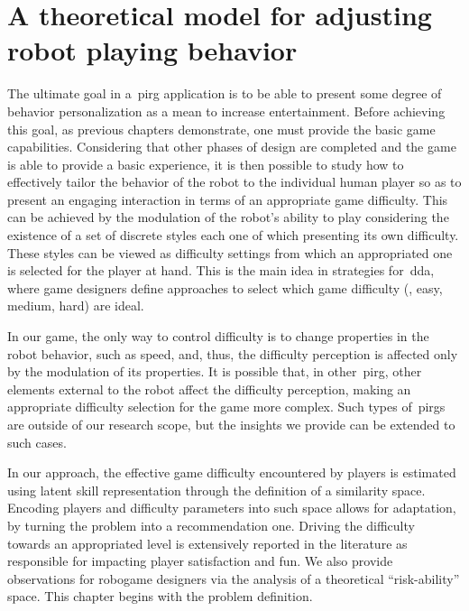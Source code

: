 \chapter{A theoretical model for adjusting robot playing behavior}\label{ch:adaptation}

The ultimate goal in a~\gls{pirg} application is to be able to present some degree of behavior personalization as a mean to increase entertainment. Before achieving this goal, as previous chapters demonstrate, one must provide the basic game capabilities. Considering that other phases of design are completed and the game is able to provide a basic experience, it is then possible to study how to effectively tailor the behavior of the robot to the individual human player so as to present an engaging interaction in terms of an appropriate game difficulty. This can be achieved by the modulation of the robot's ability to play considering the existence of a set of discrete styles each one of which presenting its own difficulty. These styles can be viewed as difficulty settings from which an appropriated one is selected for the player at hand. This is the main idea in strategies for~\glsdesc{dda}, where game designers define approaches to select which game difficulty (\eg, easy, medium, hard) are ideal. 

In our game, the only way to control difficulty is to change properties in the robot behavior, such as speed, and, thus, the difficulty perception is affected only by the modulation of its properties. It is possible that, in other~\gls{pirg}, other elements external to the robot affect the difficulty perception, making an appropriate difficulty selection for the game more complex. Such types of~\gls{pirg}s are outside of our research scope, but the insights we provide can be extended to such cases. 

In our approach, the effective game difficulty encountered by players is estimated using latent skill representation through the definition of a similarity space. Encoding players and difficulty parameters into such space allows for adaptation, by turning the problem into a recommendation one. Driving the difficulty towards an appropriated level is extensively reported in the literature as responsible for impacting player satisfaction and fun. %
We also provide observations for robogame designers via the analysis of a theoretical ``risk-ability'' space. This chapter begins with the problem definition.

